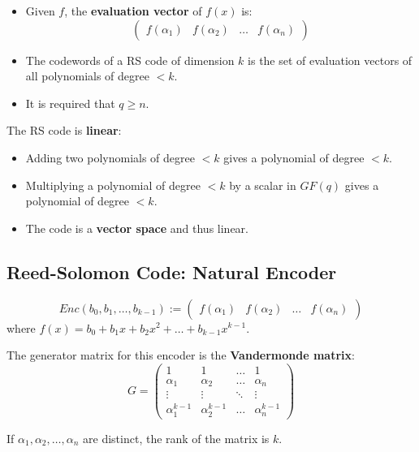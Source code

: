 \documentclass[11pt]{article}
\begin{document}
\begin{itemize}
  \item Given $f$, the \textbf{evaluation vector} of $f(x)$ is:
    \[
      \begin{pmatrix}
        f(\alpha_1) & f(\alpha_2) & \dots & f(\alpha_n)
      \end{pmatrix}
    \]
    \item The codewords of a RS code of dimension $k$ is the set of evaluation vectors of all polynomials of degree $< k$.
    \item It is required that $q \geq n$.
\end{itemize}

The RS code is \textbf{linear}:
\begin{itemize}
  \item Adding two polynomials of degree $< k$ gives a polynomial of degree $< k$.
  \item Multiplying a polynomial of degree $< k$ by a scalar in $GF(q)$ gives a polynomial of degree $< k$.
  \item The code is a \textbf{vector space} and thus linear.
\end{itemize}

\subsection{Reed-Solomon Code: Natural Encoder}
\[
  Enc(b_0, b_1, \ldots, b_{k - 1}) :=
  \begin{pmatrix}
    f(\alpha_1) & f(\alpha_2) & \dots & f(\alpha_n)
  \end{pmatrix}
\]
where $f(x) = b_0 + b_1x + b_2x^2 + \ldots + b_{k - 1}x^{k - 1}$.

The generator matrix for this encoder is the \textbf{Vandermonde matrix}:
\[
  G = 
  \begin{pmatrix}
    1 & 1 & \dots & 1 \\
    \alpha_1 & \alpha_2 & \dots & \alpha_n \\
    \vdots & \vdots & \ddots & \vdots \\
    \alpha_1^{k-1} & \alpha_2^{k-1} & \dots & \alpha_n^{k-1}
  \end{pmatrix}
\]

If $\alpha_1, \alpha_2, \dots, \alpha_n$ are distinct, the rank of the matrix is $k$.
\end{document}
